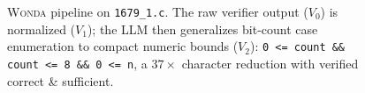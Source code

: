 \documentclass[10pt]{article}
\begin{document}
\begin{figure}[ht!]
\caption{\textsc{Wonda} pipeline on \texttt{1679\_1.c}. The raw verifier output ($V_0$) is normalized ($V_1$); the LLM then generalizes bit-count case enumeration to compact numeric bounds ($V_2$): \texttt{0 <= count \&\& count <= 8 \&\& 0 <= n}, a $37\times$ character reduction with verified correct \& sufficient.}
\label{fig:pipeline_showcase_1679_1_c}
\end{figure}
\end{document}
